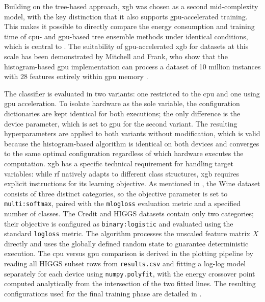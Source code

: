 Building on the tree-based approach, \gls{xgb} was chosen as a second mid-complexity model, with the key distinction that it also supports \gls{gpu}-accelerated training. This makes it possible to directly compare the energy consumption and training time of \gls{cpu}- and \gls{gpu}-based tree ensemble methods under identical conditions, which is central to . The suitability of \gls{gpu}-accelerated \gls{xgb} for datasets at this scale has been demonstrated by Mitchell and Frank, who show that the histogram-based \gls{gpu} implementation can process a dataset of 10 million instances with 28 features entirely within \gls{gpu} memory \cite{mitchellAcceleratingXGBoostAlgorithm2017}.

The classifier is evaluated in two variants: one restricted to the \gls{cpu} and one using \gls{gpu} acceleration. To isolate hardware as the sole variable, the configuration dictionaries are kept identical for both executions; the only difference is the device parameter, which is set to \gls{gpu} for the second variant. The resulting hyperparameters are applied to both variants without modification, which is valid because the histogram-based algorithm is identical on both devices and converges to the same optimal configuration regardless of which hardware executes the computation. \gls{xgb} has a specific technical requirement for handling target variables: while \gls{rf} natively adapts to different class structures, \gls{xgb} requires explicit instructions for its learning objective. As mentioned in , the Wine dataset consists of three distinct categories, so the objective parameter is set to \texttt{multi:softmax}, paired with the \texttt{mlogloss} evaluation metric and a specified number of classes. The Credit and HIGGS datasets contain only two categories; their objective is configured as \texttt{binary:logistic} and evaluated using the standard \texttt{logloss} metric. The algorithm processes the unscaled feature matrix $X$ directly and uses the globally defined random state to guarantee deterministic execution. The \gls{cpu} versus \gls{gpu} comparison is derived in the plotting pipeline by reading all HIGGS subset rows from \texttt{results.csv} and fitting a log-log model separately for each device using \texttt{numpy.polyfit}, with the energy crossover point computed analytically from the intersection of the two fitted lines. The resulting configurations used for the final training phase are detailed in .

